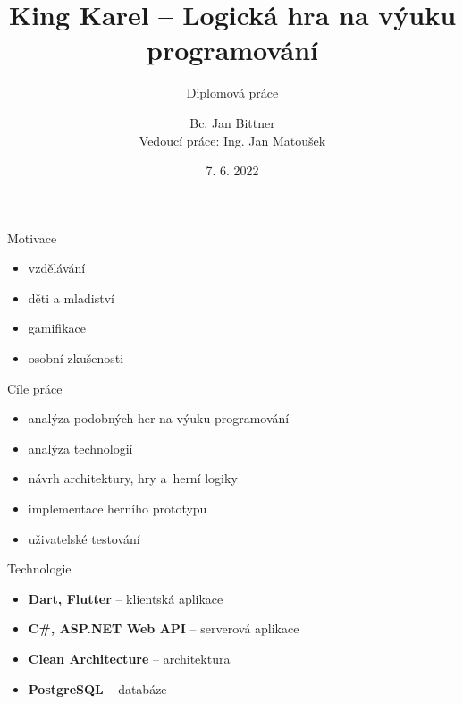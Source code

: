 \documentclass[czech,aspectratio=169]{beamer}
\title[King Karel -- Logická hra na výuku programování]{King Karel -- Logická hra na výuku programování}
\subtitle{Diplomová práce}
\institute[FIT ČVUT v~Praze]{Fakulta informačních technologií \\ České vysoké učení technické v~Praze}
\author[J. Bittner]{Bc. Jan Bittner \\ Vedoucí práce: Ing. Jan Matoušek}
\date{7. 6. 2022}
\begin{document}
  \begin{frame}
    \titlepage 
  \end{frame}
  

  \begin{frame}{Motivace}
    \begin{center}
      \begin{itemize}
        \item vzdělávání
        \item děti a mladiství
        \item gamifikace
        \item osobní zkušenosti
      \end{itemize}
    \end{center}
  \end{frame}

  \begin{frame}{Cíle práce}
    \begin{itemize}
      \item analýza podobných her na výuku programování
      \item analýza technologií
      \item návrh architektury, hry a~herní logiky
      \item implementace herního prototypu
      \item uživatelské testování
    \end{itemize}
  \end{frame}

  \begin{frame}{Technologie}
    \begin{itemize}
      \item \textbf{Dart, Flutter} -- klientská aplikace
      \item \textbf{C\#, ASP.NET Web API} -- serverová aplikace
      \item \textbf{Clean Architecture} -- architektura
      \item \textbf{PostgreSQL} -- databáze
    \end{itemize}
  \end{frame}
\end{document}
